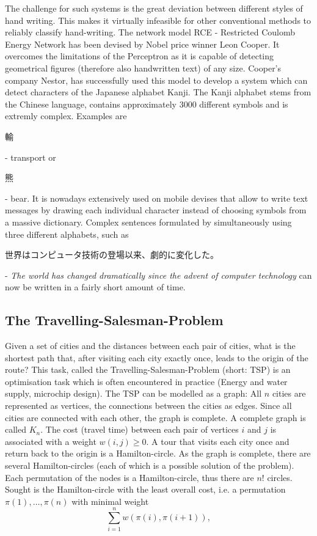 \documentclass[10pt,a4paper,DIV=11]{scrreprt}
\begin{document}
The challenge for such systems is the great deviation between different styles of hand writing. This makes it virtually infeasible for other conventional methods to reliably classify hand-writing. The network model RCE - Restricted Coulomb Energy Network has been devised by Nobel price winner Leon Cooper. It overcomes the limitations of the Perceptron as it is capable of detecting geometrical figures (therefore also handwritten text) of any size. Cooper's company Nestor, has successfully used this model to develop a system which can detect characters of the Japanese alphabet Kanji. The Kanji alphabet stems from the Chinese language, contains approximately 3000 different symbols and is extremly complex. Examples are \begin{CJK}{UTF8}{min}輸\end{CJK} - transport or \begin{CJK}{UTF8}{min}熊\end{CJK} - bear. It is nowadays extensively used on mobile devises that allow to write text messages by drawing each individual character instead of choosing symbols from a massive dictionary. Complex sentences formulated by simultaneously using three different alphabets, such as \begin{CJK}{UTF8}{min}世界はコンピュータ技術の登場以来、劇的に変化した。\end{CJK} - \textit{The world has changed dramatically since the advent of computer technology} can now be written in a fairly short amount of time.

\subsection{The Travelling-Salesman-Problem}
Given a set of cities and the distances between each pair of cities, what is the shortest path that, after visiting each city exactly once, leads to the origin of the route? This task, called the Travelling-Salesman-Problem (short: TSP) is an optimisation task which is often encountered in practice (Energy and water supply, microchip design). The TSP can be modelled as a graph: All $n$ cities are represented as vertices, the connections between the cities as edges. Since all cities are connected with each other, the graph is complete. A complete graph is called $K_n$. The cost (travel time) between each pair of vertices $i$ and $j$ is associated with a weight $w(i,j) \geq 0$. A tour that visits each city once and return back to the origin is a Hamilton-circle. As the graph is complete, there are several Hamilton-circles (each of which is a possible solution of the problem). Each permutation of the nodes is a Hamilton-circle, thus there are $n!$ circles. Sought is the Hamilton-circle with the least overall cost, i.e. a permutation $\pi(1),\dots,\pi(n)$ with minimal weight
\begin{equation}
    \sum\limits_{i=1}^n w(\pi(i),\pi(i+1)), 
\end{equation}
\end{document}
